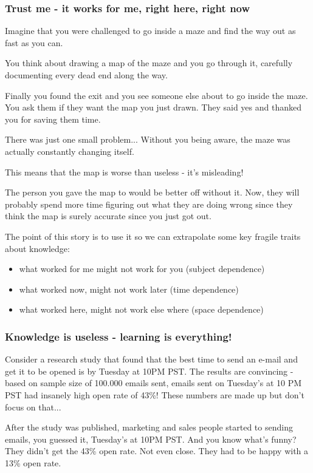 \documentclass{article}
\begin{document}
\subsubsection{Trust me - it works for me, right here, right now}

Imagine that you were challenged to go inside a maze and find the way out as fast as you can.

You think about drawing a map of the maze and you go through it, carefully documenting every dead end along the way.

Finally you found the exit and you see someone else about to go inside the maze. You ask them if they want the map you just drawn. They said yes and thanked you for saving them time.

There was just one small problem... Without you being aware, the maze was actually constantly changing itself.

This means that the map is worse than useless - it's misleading!

The person you gave the map to would be better off without it. Now, they will probably spend more time figuring out what they are doing wrong since they think the map is surely accurate since you just got out.

The point of this story is to use it so we can extrapolate some key fragile traits about knowledge: 
\begin{itemize}
	\item what worked for me might not work for you (subject dependence)
	\item  what worked now, might not work later (time dependence)
	\item  what worked here, might not work else where (space dependence)
\end{itemize}

\subsubsection{Knowledge is useless - learning is everything!}

Consider a research study that found that the best time to send an e-mail and get it to be opened is by Tuesday at 10PM PST. The results are convincing - based on sample size of 100.000 emails sent, emails sent on Tuesday's at 10 PM PST had insanely high open rate of 43\%! These numbers are made up but don't focus on that...

After the study was published, marketing and sales people started to sending emails, you guessed it, Tuesday's at 10PM PST. And you know what's funny? They didn't get the 43\% open rate. Not even close. They had to be happy with a 13\% open rate. 
\end{document}
